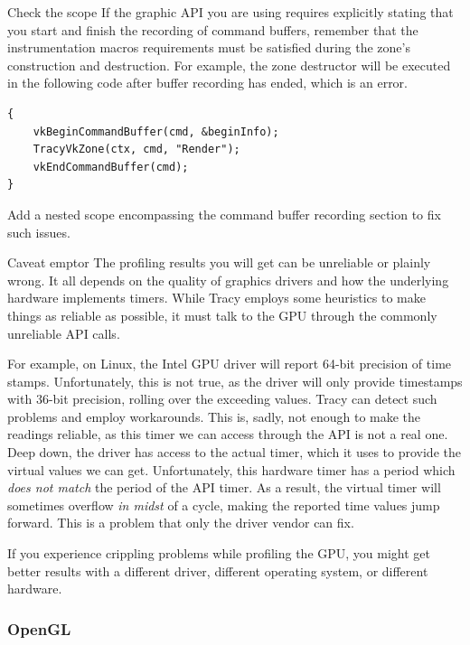 \documentclass[hidelinks,titlepage,a4paper]{article}
\begin{document}
\begin{bclogo}[
noborder=true,
couleur=black!5,
logo=\bclampe
]{Check the scope}
If the graphic API you are using requires explicitly stating that you start and finish the recording of command buffers, remember that the instrumentation macros requirements must be satisfied during the zone's construction and destruction. For example, the zone destructor will be executed in the following code after buffer recording has ended, which is an error.

\begin{lstlisting}
{
    vkBeginCommandBuffer(cmd, &beginInfo);
    TracyVkZone(ctx, cmd, "Render");
    vkEndCommandBuffer(cmd);
}
\end{lstlisting}

Add a nested scope encompassing the command buffer recording section to fix such issues.
\end{bclogo}

\begin{bclogo}[
noborder=true,
couleur=black!5,
logo=\bcattention
]{Caveat emptor}
The profiling results you will get can be unreliable or plainly wrong. It all depends on the quality of graphics drivers and how the underlying hardware implements timers. While Tracy employs some heuristics to make things as reliable as possible, it must talk to the GPU through the commonly unreliable API calls.

For example, on Linux, the Intel GPU driver will report 64-bit precision of time stamps. Unfortunately, this is not true, as the driver will only provide timestamps with 36-bit precision, rolling over the exceeding values. Tracy can detect such problems and employ workarounds. This is, sadly, not enough to make the readings reliable, as this timer we can access through the API is not a real one. Deep down, the driver has access to the actual timer, which it uses to provide the virtual values we can get. Unfortunately, this hardware timer has a period which \emph{does not match} the period of the API timer. As a result, the virtual timer will sometimes overflow \emph{in midst} of a cycle, making the reported time values jump forward. This is a problem that only the driver vendor can fix.

If you experience crippling problems while profiling the GPU, you might get better results with a different driver, different operating system, or different hardware.
\end{bclogo}

\subsubsection{OpenGL}
\end{document}
